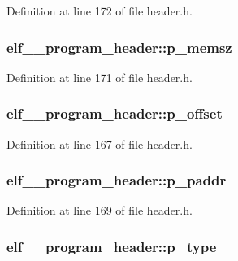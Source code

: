 Definition at line 172 of file header.h.

\hypertarget{structelf__32__program__header_a9b8d565ea2d52584f038a437a7c714c7}{
\subsubsection[{p\_\-memsz}]{ {\bf elf\_\_\-program\_\-header::p\_\-memsz}}}
\label{structelf__32__program__header_a9b8d565ea2d52584f038a437a7c714c7}


Definition at line 171 of file header.h.

\hypertarget{structelf__32__program__header_aa3e8460560d072a37656cf4fdf4839f6}{
\subsubsection[{p\_\-offset}]{ {\bf elf\_\_\-program\_\-header::p\_\-offset}}}
\label{structelf__32__program__header_aa3e8460560d072a37656cf4fdf4839f6}


Definition at line 167 of file header.h.

\hypertarget{structelf__32__program__header_ac29cb8df1e8341ad6184020d374718b3}{
\subsubsection[{p\_\-paddr}]{ {\bf elf\_\_\-program\_\-header::p\_\-paddr}}}
\label{structelf__32__program__header_ac29cb8df1e8341ad6184020d374718b3}


Definition at line 169 of file header.h.

\hypertarget{structelf__32__program__header_af220a98c5b7f9968195246e76afc2c86}{
\subsubsection[{p\_\-type}]{ {\bf elf\_\_\-program\_\-header::p\_\-type}}}
\label{structelf__32__program__header_af220a98c5b7f9968195246e76afc2c86}


